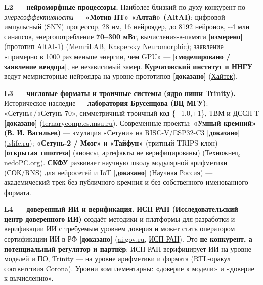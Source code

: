 \documentclass[
  russian,
]{article}
\begin{document}
\textbf{L2 --- нейроморфные процессоры.} Наиболее близкий по духу
конкурент по \emph{энергоэффективности} --- \textbf{«Мотив НТ» «Алтай»
(AltAI)}: цифровой импульсный (SNN) процессор, 28 нм, 16 нейроядер, до
8192 нейронов, \textasciitilde4 млн синапсов, энергопотребление
\textbf{70--300 мВт}, вычисления-в-памяти \textbf{{[}измерено{]}}
(прототип AltAI-1)
(\href{https://memrilab.polyketon.ru/ru/blog/altai/}{MemriLAB},
\href{https://neuro.kaspersky.ru/processor-altai/}{Kaspersky
Neuromorphic}); заявление «примерно в 1000 раз меньше энергии, чем GPU»
--- \textbf{{[}смоделировано / заявление вендора{]}}, не независимый
замер. \textbf{Курчатовский институт и ННГУ} ведут мемристорные
нейроядра на уровне прототипов \textbf{{[}доказано{]}}
(\href{https://hightech.fm/2024/12/24/memristor-neuromorphic}{Хайтек}).

\textbf{L3 --- числовые форматы и троичные системы (ядро ниши Trinity).}
Историческое наследие --- \textbf{лаборатория Брусенцова (ВЦ МГУ)}:
«Сетунь»/«Сетунь 70», симметричный троичный код \{−1,0,+1\}, ТВМ и
ДССП-Т \textbf{{[}доказано{]}}
(\href{https://ternarycomp.cs.msu.ru/Papers/brusentsov_ramil_alvarez_setun_70.pdf}{ternarycomp.cs.msu.ru}).
Современные проекты: \textbf{«Умный кремний» (В. И. Васильев)} ---
эмуляция «Сетуни» на RISC-V/ESP32-C3 \textbf{{[}доказано{]}}
(\href{https://www.islife.ru/post/pub00061/}{islife.ru});
\textbf{«Сетунь-2 / Мозг»} и \textbf{«Тайфун»} (тритный TRIPS-клон) ---
\textbf{{[}открытая гипотеза{]}} (анонсы, артефакты не верифицированы)
(\href{https://t.me/s/technojnec?before=4062}{Техножнец},
\href{http://www.nedopc.org/forum/viewtopic.php?t=22152}{nedoPC.org}).
\textbf{СКФУ} развивает научную школу модулярной арифметики (СОК/RNS)
для нейросетей и IoT \textbf{{[}доказано{]}}
(\href{https://scientificrussia.ru/articles/uchyonye-skfu-povysili-skorost-preobrazovaniya-informatsii-v-internete-veshchej}{Научная
Россия}) --- академический трек без публичного кремния и без
собственного именованного формата.

\textbf{L4 --- доверенный ИИ и верификация.} \textbf{ИСП РАН
(Исследовательский центр доверенного ИИ)} создаёт методики и платформы
для разработки и верификации ИИ с требуемым уровнем доверия и может
стать оператором сертификации ИИ в РФ \textbf{{[}доказано{]}}
(\href{https://ai.gov.ru/ai/ecosystem/issledovatelskiy-tsentr-iskusstvennogo-intellekta-na-baze-isp-ran1701974716/}{ai.gov.ru},
\href{https://www.ispras.ru/ai-center/}{ИСП РАН}). Это \textbf{не
конкурент, а потенциальный регулятор и партнёр}: ИСП РАН верифицирует ИИ
на уровне моделей и ПО, Trinity --- на уровне арифметики и формата
(RTL-оракул соответствия Corona). Уровни комплементарны: «доверие к модели» и
«доверие к вычислению».
\end{document}
